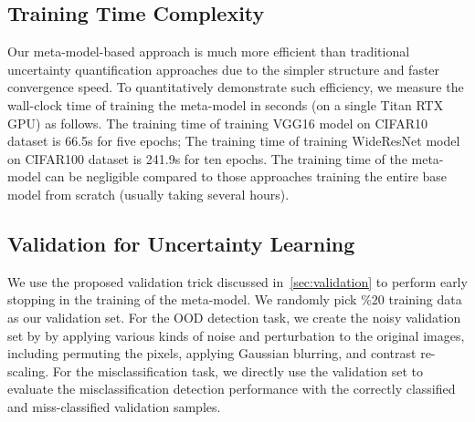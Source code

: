 \subsection{Training Time Complexity}
Our meta-model-based approach is much more efficient than traditional uncertainty quantification approaches due to the simpler structure and faster convergence speed. To quantitatively demonstrate such efficiency, we measure the wall-clock time of training the meta-model in seconds (on a single Titan RTX GPU) as follows. The training time of training VGG16 model on CIFAR10 dataset is 66.5s for five epochs; The training time of training WideResNet model on CIFAR100 dataset is 241.9s for ten epochs. The training time of the meta-model can be negligible compared to those approaches training the entire base model from scratch (usually taking several hours).


\subsection{Validation for Uncertainty Learning}
We use the proposed validation trick discussed in~\ref{sec:validation} to perform early stopping in the training of the meta-model. We randomly pick $\%20$ training data as our validation set. For the OOD detection task, we create the noisy validation set by by applying various kinds of noise and perturbation to the original images, including permuting the pixels, applying Gaussian blurring, and contrast re-scaling. For the misclassification task, we directly use the validation set to evaluate the misclassification detection performance with the correctly classified and miss-classified validation samples.

